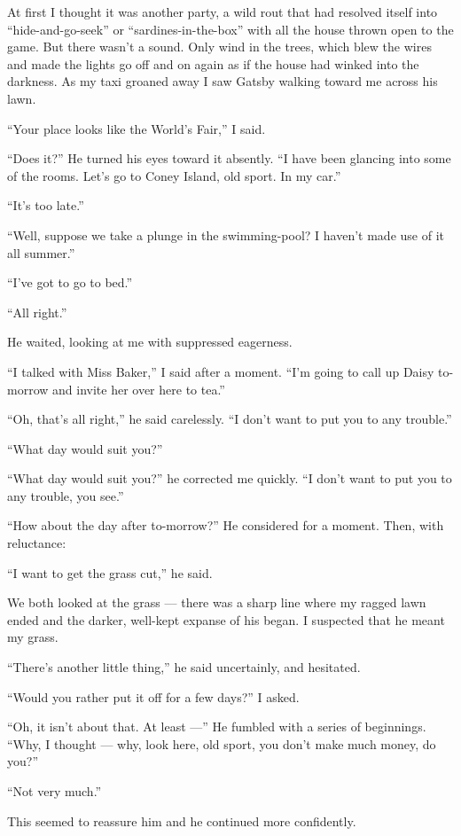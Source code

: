 \documentclass{znotebook}
\begin{document}
At first I thought it was another party, a wild rout that had resolved itself into ``hide-and-go-seek'' or ``sardines-in-the-box'' with all the house thrown open to the game. But there wasn't a sound. Only wind in the trees, which blew the wires and made the lights go off and on again as if the house had winked into the darkness. As my taxi groaned away I saw Gatsby walking toward me across his lawn.

``Your place looks like the World's Fair,'' I said.

``Does it?'' He turned his eyes toward it absently. ``I have been glancing into some of the rooms. Let's go to Coney Island, old sport. In my car.''

``It's too late.''

``Well, suppose we take a plunge in the swimming-pool? I haven't made use of it all summer.''

``I've got to go to bed.''

``All right.''

He waited, looking at me with suppressed eagerness.

``I talked with Miss Baker,'' I said after a moment. ``I'm going to call up Daisy to-morrow and invite her over here to tea.''

``Oh, that's all right,'' he said carelessly. ``I don't want to put you to any trouble.''

``What day would suit you?''

``What day would suit you?'' he corrected me quickly. ``I don't want to put you to any trouble, you see.''

``How about the day after to-morrow?'' He considered for a moment. Then, with reluctance:

``I want to get the grass cut,'' he said.

We both looked at the grass ---{} there was a sharp line where my ragged lawn ended and the darker, well-kept expanse of his began. I suspected that he meant my grass.

``There's another little thing,'' he said uncertainly, and hesitated.

``Would you rather put it off for a few days?'' I asked.

``Oh, it isn't about that. At least ---'' He fumbled with a series of beginnings. ``Why, I thought ---{} why, look here, old sport, you don't make much money, do you?''

``Not very much.''

This seemed to reassure him and he continued more confidently.
\end{document}
